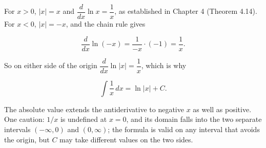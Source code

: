 \documentclass[a4paper,12pt,oneside]{memoir}
\begin{document}
For \(x > 0\), \(\lvert x\rvert = x\) and \(\dfrac{d}{dx}\ln x = \dfrac{1}{x}\), as established in Chapter 4 (Theorem 4.14). For \(x < 0\), \(\lvert x\rvert = -x\), and the chain rule gives

\[ \frac{d}{dx}\ln(-x) = \frac{1}{-x}\cdot(-1) = \frac{1}{x}. \]

So on either side of the origin \(\dfrac{d}{dx}\ln\lvert x\rvert = \dfrac{1}{x}\), which is why

\[ \int \frac{1}{x}\,dx = \ln\lvert x\rvert + C. \]

The absolute value extends the antiderivative to negative \(x\) as well as positive. One caution: \(1/x\) is undefined at \(x = 0\), and its domain falls into the two separate intervals \((-\infty, 0)\) and \((0, \infty)\); the formula is valid on any interval that avoids the origin, but \(C\) may take different values on the two sides.
\end{document}
